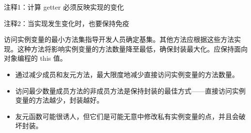 {\footnotesize
注释1：计算 getter 必须反映实现的变化

注释2：当实现发生变化时，也要保持免疫
}

访问实例变量的最小方法集指导开发人员确定基集。其他方法应根据这些方法实现。这种方法将影响实例变量的方法数量降至最低，确保封装最大化。应保持面向对象编程的 this 值。


\begin{itemize}
\item
通过减少成员和友元方法，最大限度地减少直接访问实例变量的方法数量。

\item
访问最少数量成员方法的非成员方法是保持封装的最佳方式——直接访问实例变量的方法越少，封装越好。

\item
友元函数可能很诱人，但它们是可能无意中修改私有实例变量的点，并且会破坏封装。
\end{itemize}













